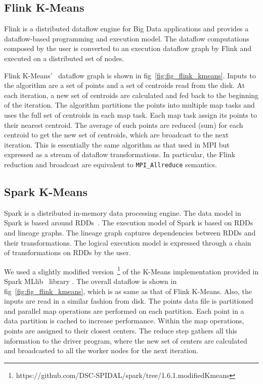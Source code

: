 \documentclass[10pt, conference, compsocconf]{IEEEtran}
\begin{document}
\subsection{Flink K-Means}
Flink is a distributed  dataflow engine for Big Data applications and provides a dataflow-based programming and execution model. The dataflow computations composed by the user is converted to an execution dataflow graph by Flink and executed on a distributed set of nodes.

Flink K-Means'~\cite{flink-kmeans} dataflow graph is shown in fig~\ref{fig:fig_flink_kmeans}. Inputs to the algorithm are a set of points and a set of centroids read from the disk. At each iteration, a new set of centroids are calculated and fed back to the beginning of the iteration. The algorithm partitions the points into multiple map tasks and uses the full set of centroids in each map task. Each map task assign its points to their nearest centroid. The average of such points are reduced (sum) for each centroid to get the new set of centroids, which are broadcast to the next iteration. This is essentially the same algorithm as that used in \ac{MPI} but expressed as a stream of dataflow transformations. In particular, the Flink reduction and broadcast are equivalent to \texttt{MPI\_Allreduce} semantics.

\subsection{Spark K-Means}
Spark is a distributed in-memory data processing engine. The data model in Spark is based around \acp{RDD}~\cite{zaharia2012resilient}. The execution model of Spark is based on \acp{RDD} and lineage graphs. The lineage graph captures dependencies between \acp{RDD} and their transformations. The logical execution model is expressed through a chain of transformations on \acp{RDD} by the user.

We used a slightly modified version~\footnote{https://github.com/DSC-SPIDAL/spark/tree/1.6.1.modifiedKmeans} of the K-Means implementation provided in Spark MLlib~\cite{meng2016mllib} library . The overall  dataflow is shown in fig~\ref{fig:fig_flink_kmeans}, which is as same as that of Flink K-Means. Also, the inputs are read in a similar fashion from disk. The points data file is partitioned and parallel map operations are performed on each partition. Each point in a data partition is cached to increase performance. Within the map operations, points are assigned to their closest centers. The reduce step gathers all this information to the driver program, where the new set of centers are calculated and broadcasted to all the worker nodes for the next iteration. 
\end{document}

